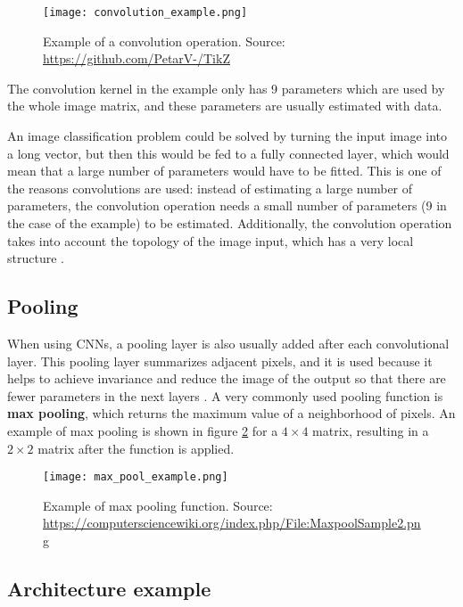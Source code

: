 \begin{figure}[H]
    \centering
    \texttt{[image: convolution\_example.png]}
    \caption{Example of a convolution operation. Source: \url{https://github.com/PetarV-/TikZ}}
    \label{fig:conv_example}
\end{figure}

The convolution kernel in the example only has 9 parameters which are used by the whole image matrix, and these parameters are usually estimated with data.

An image classification problem could be solved by turning the input image into a long vector, but then this would be fed to a fully connected layer, which would mean that a large number of parameters would have to be fitted. This is one of the reasons convolutions are used: instead of estimating a large number of parameters, the convolution operation needs a small number of parameters (9 in the case of the example) to be estimated. Additionally, the convolution operation takes into account the topology of the image input, which has a very local structure \cite{lecun1998gradient}.

\subsection{Pooling}

When using CNNs, a pooling layer is also usually added after each convolutional layer. This pooling layer summarizes adjacent pixels, and it is used because it helps to achieve invariance and reduce the image of the output so that there are fewer parameters in the next layers \cite{bengio2015deep}. A very commonly used pooling function is \textbf{max pooling}, which returns the maximum value of a neighborhood of pixels. An example of max pooling is shown in figure \ref{fig:max_pool_example} for a $4 \times 4$ matrix, resulting in a $2 \times 2$ matrix after the function is applied.

\begin{figure}[H]
    \centering
    \texttt{[image: max\_pool\_example.png]}
    \caption{Example of max pooling function. Source: \url{https://computersciencewiki.org/index.php/File:MaxpoolSample2.png}}
    \label{fig:max_pool_example}
\end{figure}


\subsection{Architecture example}

